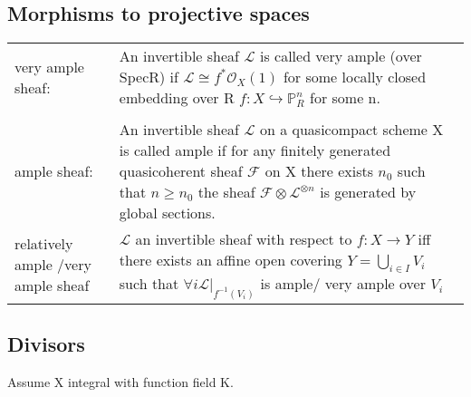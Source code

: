 \documentclass[a4paper, 12pt]{article}
\newcommand{\ca}[1]{\mathcal{#1}}
\newcommand{\caf}{\mathcal{F}}
\newcommand{\ox}{\mathcal{O}_X}
\begin{document}
\subsection{Morphisms to projective spaces}

\begin{tabular}{p{4cm} p{11cm}}

very ample sheaf: &  An invertible sheaf $\ca{L}$ is called very ample (over SpecR) if $\ca{L} \cong f^{\ast}\ox(1)$ for some locally closed embedding over R $f:X\hookrightarrow \mathbb{P}^n_R $ for some n.
\\

\\

  ample sheaf:& An invertible sheaf $\ca{L}$ on a quasicompact scheme X is called ample if for any finitely generated quasicoherent sheaf $\caf$ on X there exists $n_0$ such that $n \geq n_0 $ the sheaf $\caf\otimes\ca{L}^{\otimes n}$ is generated by global sections.

  \\


  relatively ample /very ample sheaf & $\ca{L}$ an invertible sheaf with respect to $f:X\longrightarrow Y$ iff there exists an affine open covering $Y = \bigcup_{i\in I} V_i$ such that $\forall i \ca{L}|_{f^{-1}(V_i)}$ is ample/ very ample over $V_i$
  \\
\end{tabular}

\subsection{Divisors}


Assume X integral with function field K.
\end{document}

